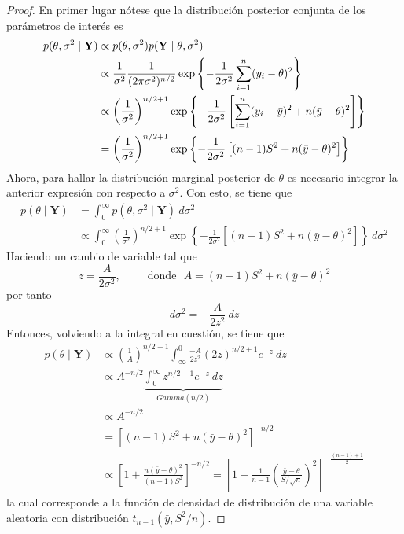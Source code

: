 \documentclass[10pt,openright]{book}\usepackage[]{graphicx}\usepackage[]{color}
\begin{document}
\begin{proof}
En primer lugar n\'otese que la distribuci\'on posterior conjunta de los par\'ametros de inter\'es es
\begin{align}\label{prop_theta_sigma2}
p(\theta,\sigma^2 \mid \mathbf{Y})& \propto p(\theta,\sigma^2)p(\mathbf{Y} \mid \theta,\sigma^2) \notag \\
& \propto \frac{1}{\sigma^2}\frac{1}{(2\pi\sigma^2)^{n/2}}\exp\left\{-\frac{1}{2\sigma^2}\sum_{i=1}^n(y_i-\theta)^2\right\} \notag\\
& \propto \left(\frac{1}{\sigma^2}\right)^{n/2+1}
\exp\left\{-\frac{1}{2\sigma^2}\left[\sum_{i=1}^n(y_i-\bar{y})^2+n(\bar{y}-\theta)^2\right]\right\} \notag \\
&= \left(\frac{1}{\sigma^2}\right)^{n/2+1}
\exp\left\{-\frac{1}{2\sigma^2}\left[(n-1)S^2+n(\bar{y}-\theta)^2\right]\right\}
\end{align}
Ahora, para hallar la distribuci\'on marginal posterior de $\theta$ es necesario integrar la anterior expresi\'on con respecto a $\sigma^2$. Con esto, se tiene que
\begin{align*}
p(\theta \mid \mathbf{Y})&= \int_0^{\infty} p(\theta,\sigma^2 \mid \mathbf{Y}) \ d\sigma^2 \\
&\propto \int_0^{\infty} \left(\frac{1}{\sigma^2}\right)^{n/2+1}
\exp\left\{-\frac{1}{2\sigma^2}\left[(n-1)S^2+n(\bar{y}-\theta)^2\right]\right\} \ d\sigma^2
\end{align*}
Haciendo un cambio de variable tal que
\begin{equation*}
z=\frac{A}{2\sigma^2}, \ \ \ \ \ \ \ \ \ \ \ \text{donde} \ \ \ A=(n-1)S^2+n(\bar{y}-\theta)^2
\end{equation*}
por tanto
\begin{equation*}
d\sigma^2=-\frac{A}{2z^2} \ dz
\end{equation*}
Entonces, volviendo a la integral en cuesti\'on, se tiene que
\begin{align*}
p(\theta \mid \mathbf{Y})& \propto
\left(\frac{1}{A}\right)^{n/2+1}\int_{\infty}^{0} \frac{-A}{2z^2} (2z)^{n/2+1}e^{-z} \ dz \\
&\propto A^{-n/2}\underbrace{\int_{0}^{\infty} z^{n/2-1}e^{-z}\ dz}_{Gamma(n/2)}\\
&\propto A^{-n/2}\\
&= [(n-1)S^2+n(\bar{y}-\theta)^2]^{-n/2}\\
&\propto \left[1+\frac{n(\bar{y}-\theta)^2}{(n-1)S^2}\right]^{-n/2}
=\left[1+\frac{1}{n-1}\left(\frac{\bar{y}-\theta}{S/\sqrt{n}}\right)^2\right]^{-\frac{(n-1)+1}{2}}
\end{align*}
la cual corresponde a la funci\'on de densidad de distribuci\'on de una variable aleatoria con distribuci\'on $t_{n-1}(\bar{y},S^2/n)$.
\end{proof}
\end{document}
